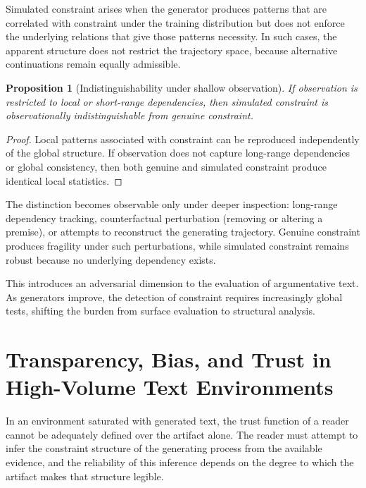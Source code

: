 \documentclass[12pt, oneside]{article}
\theoremstyle{plain}
\newtheorem{proposition}[theorem]{Proposition}
\theoremstyle{definition}
\theoremstyle{remark}
\begin{document}
Simulated constraint arises when the generator produces patterns that are correlated
with constraint under the training distribution but does not enforce the underlying
relations that give those patterns necessity. In such cases, the apparent structure
does not restrict the trajectory space, because alternative continuations remain
equally admissible.

\begin{proposition}[Indistinguishability under shallow observation]
If observation is restricted to local or short-range dependencies, then simulated
constraint is observationally indistinguishable from genuine constraint.
\end{proposition}

\begin{proof}
Local patterns associated with constraint can be reproduced independently of the
global structure. If observation does not capture long-range dependencies or
global consistency, then both genuine and simulated constraint produce identical
local statistics.
\end{proof}

The distinction becomes observable only under deeper inspection: long-range
dependency tracking, counterfactual perturbation (removing or altering a premise),
or attempts to reconstruct the generating trajectory. Genuine constraint produces
fragility under such perturbations, while simulated constraint remains robust
because no underlying dependency exists.

This introduces an adversarial dimension to the evaluation of argumentative text.
As generators improve, the detection of constraint requires increasingly global
tests, shifting the burden from surface evaluation to structural analysis.

\section{Transparency, Bias, and Trust in High-Volume Text Environments}

In an environment saturated with generated text, the trust function of a reader cannot be
adequately defined over the artifact alone. The reader must attempt to infer the constraint
structure of the generating process from the available evidence, and the reliability of this
inference depends on the degree to which the artifact makes that structure legible.
\end{document}
